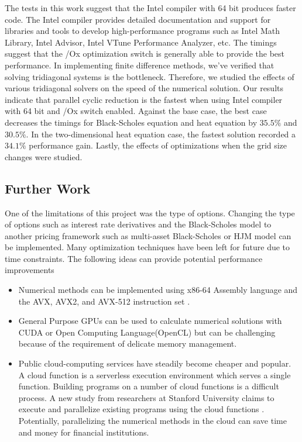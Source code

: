 \documentclass[12pt, oneside]{book}
\theoremstyle{plain}
\theoremstyle{definition}
\begin{document}
The tests in this work suggest that the Intel compiler with 64 bit produces faster code. The Intel compiler provides detailed documentation and support for libraries and tools to develop high-performance programs such as Intel Math Library, Intel Advisor, Intel VTune Performance Analyzer, etc. The timings suggest that the /Ox optimization switch is generally able to provide the best performance. In implementing finite difference methods, we’ve verified that solving tridiagonal systems is the bottleneck. Therefore, we studied the effects of various tridiagonal solvers on the speed of the numerical solution. 
Our results indicate that parallel cyclic reduction is the fastest when using Intel compiler with 64 bit and /Ox switch enabled. Against the base case, the best case decreases the timings for Black-Scholes equation and heat equation by $35.5 \%$ and $30.5 \%$. In the two-dimensional heat equation case, the fastest solution recorded a  $34.1 \%$ performance gain. Lastly, the effects of optimizations when the grid size changes were studied. 

\subsection{Further Work}
One of the limitations of this project was the type of options. Changing the type of options such as interest rate derivatives and the Black-Scholes model to another pricing framework such as multi-asset Black-Scholes or HJM model \cite{kohl} can be implemented. Many optimization techniques have been left for future due to time constraints. The following ideas can provide potential performance improvements
\begin{itemize}
\item Numerical methods can be implemented using x86-64 Assembly language and the AVX, AVX2, and AVX-512 instruction set \cite{kusswurm}.
\item General Purpose GPUs can be used to calculate numerical solutions with CUDA or Open Computing Language(OpenCL) but can be challenging because of the requirement of delicate memory management.
\item Public cloud-computing services have steadily become cheaper and popular. A cloud function is a serverless execution environment which serves a single function. Building programs on a number of cloud functions is a difficult process. A new study from researchers at Stanford University claims to execute and parallelize existing programs using the cloud functions  \cite{cloudfunc}. Potentially, parallelizing the numerical methods in the cloud can save time and money for financial institutions.
\end{itemize}
\end{document}
